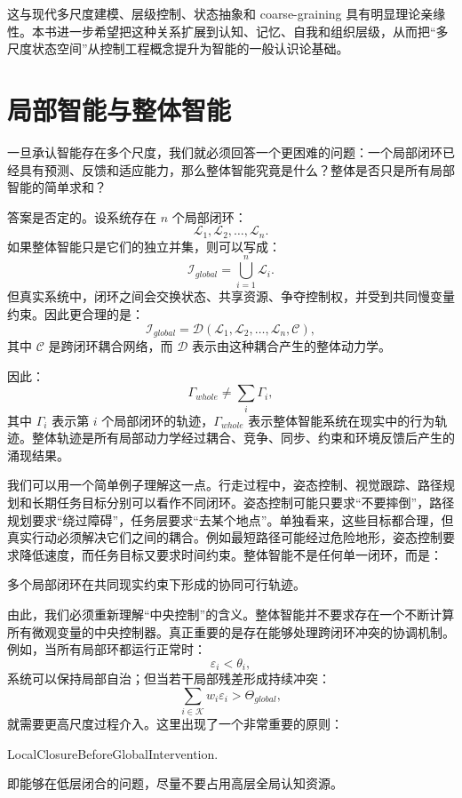 这与现代多尺度建模、层级控制、状态抽象和 coarse-graining 具有明显理论亲缘性。本书进一步希望把这种关系扩展到认知、记忆、自我和组织层级，从而把“多尺度状态空间”从控制工程概念提升为智能的一般认识论基础。

\section{局部智能与整体智能}

一旦承认智能存在多个尺度，我们就必须回答一个更困难的问题：一个局部闭环已经具有预测、反馈和适应能力，那么整体智能究竟是什么？整体是否只是所有局部智能的简单求和？

答案是否定的。设系统存在 $n$ 个局部闭环：
\[
\mathcal{L}_1,\mathcal{L}_2,\ldots,\mathcal{L}_n.
\]
如果整体智能只是它们的独立并集，则可以写成：
\[
\mathcal{I}_{global}
=
\bigcup_{i=1}^{n}\mathcal{L}_i.
\]
但真实系统中，闭环之间会交换状态、共享资源、争夺控制权，并受到共同慢变量约束。因此更合理的是：
\[
\mathcal{I}_{global}
=
\mathcal{D}
\left(
\mathcal{L}_1,
\mathcal{L}_2,
\ldots,
\mathcal{L}_n,
\mathcal{C}
\right),
\]
其中 $\mathcal{C}$ 是跨闭环耦合网络，而 $\mathcal{D}$ 表示由这种耦合产生的整体动力学。

因此：
\[
\boxed{
\Gamma_{whole}
\neq
\sum_i\Gamma_i,
}
\]
其中 $\Gamma_i$ 表示第 $i$ 个局部闭环的轨迹，$\Gamma_{whole}$ 表示整体智能系统在现实中的行为轨迹。整体轨迹是所有局部动力学经过耦合、竞争、同步、约束和环境反馈后产生的涌现结果。

我们可以用一个简单例子理解这一点。行走过程中，姿态控制、视觉跟踪、路径规划和长期任务目标分别可以看作不同闭环。姿态控制可能只要求“不要摔倒”，路径规划要求“绕过障碍”，任务层要求“去某个地点”。单独看来，这些目标都合理，但真实行动必须解决它们之间的耦合。例如最短路径可能经过危险地形，姿态控制要求降低速度，而任务目标又要求时间约束。整体智能不是任何单一闭环，而是：
\begin{statementbox}
多个局部闭环在共同现实约束下形成的协同可行轨迹。
\end{statementbox}

由此，我们必须重新理解“中央控制”的含义。整体智能并不要求存在一个不断计算所有微观变量的中央控制器。真正重要的是存在能够处理跨闭环冲突的协调机制。例如，当所有局部环都运行正常时：
\[
\varepsilon_i<\theta_i,
\]
系统可以保持局部自治；但当若干局部残差形成持续冲突：
\[
\sum_{i\in\mathcal{K}}
w_i\varepsilon_i
>
\Theta_{global},
\]
就需要更高尺度过程介入。这里出现了一个非常重要的原则：
\begin{statementbox}
LocalClosureBeforeGlobalIntervention.
\end{statementbox}
即能够在低层闭合的问题，尽量不要占用高层全局认知资源。

